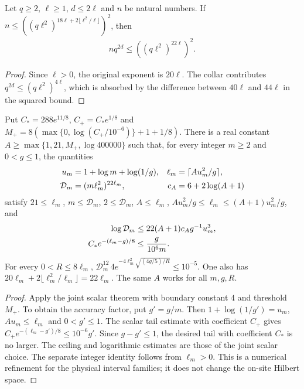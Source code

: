 \begin{lemma}
    \label{thm:physical_dg_collar_budget}
    \leanok
    Let $q\ge2$, $\ell\ge1$, $d\le2\ell$ and $n$ be natural numbers.
    If $n\le((q\ell^2)^{18\ell+2\lfloor\ell^2/\ell\rfloor})^2$, then
    \begin{align}
        nq^{2d}\le((q\ell^2)^{22\ell})^2.
    \end{align}
\end{lemma}
\begin{proof}
    \leanok
    Since $\ell>0$, the original exponent is $20\ell$.
    The collar contributes $q^{2d}\le(q\ell^2)^{4\ell}$, which is absorbed
    by the difference between $40\ell$ and $44\ell$ in the squared bound.
\end{proof}

\begin{lemma}
    \label{thm:dg_accuracy_scalar_parameters}
    \leanok
    Put $C_*=288e^{11/8}$, $C_+=C_*e^{1/8}$ and
    $M_+=8(\max\{0,\log(C_+/10^{-6})\}+1+1/8)$.
    There is a real constant $A\ge\max\{1,21,M_+,\log400000\}$ such that,
    for every integer $m\ge2$ and $0<g\le1$, the quantities
    \begin{align}
        u_m          & =1+\log m+\log(1/g),     & \ell_m & =\lceil Au_m^2/g\rceil,\notag \\
        \mathcal D_m & =(m\ell_m^2)^{22\ell_m}, & c_A    & =6+2\log(A+1)
    \end{align}
    satisfy $21\le\ell_m$, $m\le\mathcal D_m$, $2\le\mathcal D_m$,
    $A\le\ell_m$, $Au_m^2/g\le\ell_m\le(A+1)u_m^2/g$, and
    \begin{align}
        \log\mathcal D_m     & \le22(A+1)c_Ag^{-1}u_m^3,\notag \\
        C_*e^{-(\ell_m-g)/8} & \le\frac{g}{10^6m}.
    \end{align}
    For every $0<R\le8\ell_m$,
    $\mathcal D_m^{12}\,4e^{-4\ell_m^2\sqrt{(4g/5)/R}}\le10^{-5}$.
    One also has $20\ell_m+2\lfloor\ell_m^2/\ell_m\rfloor=22\ell_m$.
    The same $A$ works for all $m,g,R$.
\end{lemma}
\begin{proof}
    \leanok
    Apply the joint scalar theorem with boundary constant $4$ and threshold
    $M_+$. To obtain the accuracy factor, put $g'=g/m$. Then
    $1+\log(1/g')=u_m$, $Au_m\le\ell_m$ and $0<g'\le1$.
    The scalar tail estimate with coefficient $C_+$ gives
    $C_+e^{-(\ell_m-g')/8}\le10^{-6}g'$.
    Since $g-g'\le1$, the desired tail with coefficient $C_*$ is no larger.
    The ceiling and logarithmic estimates are those of the joint scalar
    choice. The separate integer identity follows from $\ell_m>0$.
    This is a numerical refinement for the physical interval families;
    it does not change the on-site Hilbert space.
\end{proof}

